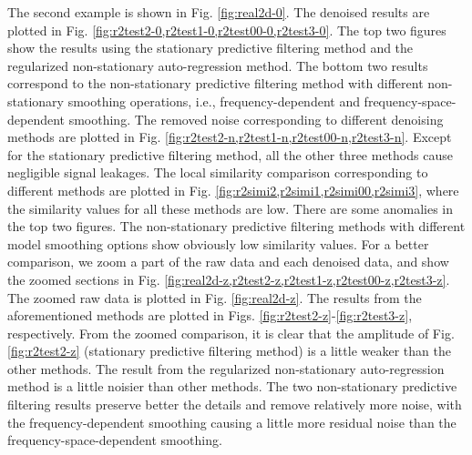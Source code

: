 The second example is shown in Fig. \ref{fig:real2d-0}.  The denoised results are plotted in Fig. \ref{fig:r2test2-0,r2test1-0,r2test00-0,r2test3-0}. The top two figures show the results using the stationary predictive filtering method and the regularized non-stationary auto-regression method. The bottom two results correspond to the non-stationary predictive filtering method with different non-stationary smoothing operations, i.e., frequency-dependent and frequency-space-dependent smoothing. The removed noise corresponding to different denoising methods are plotted in Fig. \ref{fig:r2test2-n,r2test1-n,r2test00-n,r2test3-n}. Except for the stationary predictive filtering method, all the other three methods cause negligible signal leakages. The local similarity comparison corresponding to different methods are plotted in Fig. \ref{fig:r2simi2,r2simi1,r2simi00,r2simi3}, where the similarity values for all these methods are low. There are some anomalies in the top two figures. The non-stationary predictive filtering methods with different model smoothing options show obviously low similarity values. For a better comparison, we zoom a part of the raw data and each denoised data, and show the zoomed sections in Fig. \ref{fig:real2d-z,r2test2-z,r2test1-z,r2test00-z,r2test3-z}. The zoomed raw data is plotted in Fig. \ref{fig:real2d-z}. The results from the aforementioned methods are plotted in Figs. \ref{fig:r2test2-z}-\ref{fig:r2test3-z}, respectively. From the zoomed comparison, it is clear that the amplitude of Fig. \ref{fig:r2test2-z} (stationary predictive filtering method) is a little weaker than the other methods. The result from the regularized non-stationary auto-regression method is a little noisier than other methods. The two non-stationary predictive filtering results preserve better the details and remove relatively more noise, with the frequency-dependent smoothing causing a little more residual noise than the frequency-space-dependent smoothing.  %

